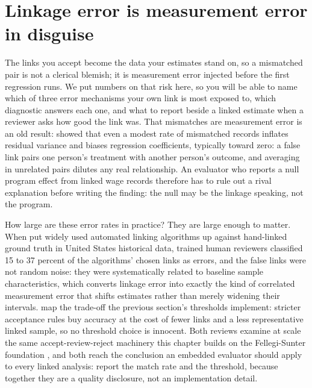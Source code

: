 \section{Linkage error is measurement error in disguise}\label{sec:ch06-linkerror}
The links you accept become the data your estimates stand on, so a mismatched pair is not a clerical blemish; it is measurement error injected before the first regression runs. We put numbers on that risk here, so you will be able to name which of three error mechanisms your own link is most exposed to, which diagnostic answers each one, and what to report beside a linked estimate when a reviewer asks how good the link was. That mismatches are measurement error is an old result: \textcite{neter1965mismatch} showed that even a modest rate of mismatched records inflates residual variance and biases regression coefficients, typically toward zero: a false link pairs one person's treatment with another person's outcome, and averaging in unrelated pairs dilutes any real relationship. An evaluator who reports a null program effect from linked wage records therefore has to rule out a rival explanation before writing the finding: the null may be the linkage speaking, not the program.

How large are these error rates in practice? They are large enough to matter. When \textcite{bailey2020linking} put widely used automated linking algorithms up against hand-linked ground truth in United States historical data, trained human reviewers classified 15 to 37 percent of the algorithms' chosen links as errors, and the false links were not random noise: they were systematically related to baseline sample characteristics, which converts linkage error into exactly the kind of correlated measurement error that shifts estimates rather than merely widening their intervals. \textcite{abramitzky2021linking} map the trade-off the previous section's thresholds implement: stricter acceptance rules buy accuracy at the cost of fewer links and a less representative linked sample, so no threshold choice is innocent. Both reviews examine at scale the same accept-review-reject machinery this chapter builds on the Fellegi-Sunter foundation \parencite{fellegi1969linkage}, and both reach the conclusion an embedded evaluator should apply to every linked analysis: report the match rate and the threshold, because together they are a quality disclosure, not an implementation detail.

